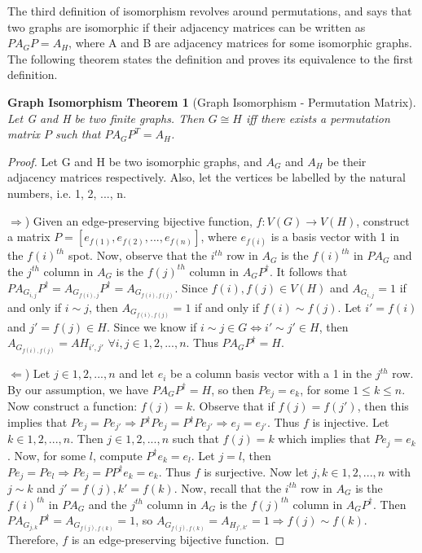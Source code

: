 \documentclass[12pt]{article}
\newtheorem{GraphIsomorphism}{Graph Isomorphism Theorem}
\theoremstyle{definition}
\begin{document}
The third definition of isomorphism revolves around permutations, and says that two graphs are isomorphic if their adjacency matrices can be written as $PA_GP = A_H$, where A and B are adjacency matrices for some isomorphic graphs. The following theorem states the definition and proves its equivalence to the first definition.

\begin{GraphIsomorphism}[Graph Isomorphism - Permutation Matrix]
Let G and H be two finite graphs. Then $G \cong H$ iff there exists a permutation matrix $P$ such that $PA_GP^T = A_H$.
\end{GraphIsomorphism}

\begin{proof}
Let G and H be two isomorphic graphs, and $A_G$ and $A_H$ be their adjacency matrices respectively. Also, let the vertices be labelled by the natural numbers, i.e. 1, 2, ..., n.

$\Rightarrow$) Given an edge-preserving bijective function, $f:V(G) \to V(H)$, construct a matrix $P = [e_{f(1)}, e_{f(2)}, ..., e_{f(n)}]$, where $e_{f(i)}$ is a basis vector with 1 in the $f(i)^{th}$ spot. Now, observe that the $i^{th}$ row in $A_G$ is the $f(i)^{th}$ in $PA_G$ and the $j^{th}$ column in $A_G$ is the $f(j)^{th}$ column in $A_GP^{\dag}$. It follows that $PA_{G_{i, j}}P^{\dag} = A_{G_{f(i), j}}P^{\dag} = A_{G_{f(i), f(j)}}$. Since $f(i), f(j) \in V(H)$ and $A_{G_{i, j}} = 1$ if and only if $i \sim j$, then $A_{G_{f(i), f(j)}} = 1$ if and only if $f(i) \sim f(j)$. Let $i' = f(i)$ and $j' = f(j) \in H$. Since we know if $i \sim j \in G \Leftrightarrow i' \sim j' \in H$, then $A_{G_{f(i), f(j)}} = A{H_{i', j'}}$ $\forall i, j \in 1, 2, ..., n$. Thus $PA_GP^{\dag} = H$.

$\Leftarrow$) Let $j \in 1, 2, ..., n$ and let $e_i$ be a column basis vector with a 1 in the $j^{th}$ row. By our assumption, we have $PA_GP^{\dag} = H$, so then $Pe_j = e_k$, for some $1 \leq k \leq n$. Now construct a function: $f(j) = k$. Observe that if $f(j) = f(j')$, then this implies that $Pe_j = Pe_{j'} \Rightarrow P^{\dag}Pe_j = P^{\dag}Pe_{j'} \Rightarrow e_j = e_{j'}$. Thus $f$ is injective. Let $k \in 1, 2, ..., n$. Then $j \in 1, 2, ..., n$ such that $f(j) = k$ which implies that $Pe_j = e_k$. Now, for some $l$, compute $P^{\dag}e_k = e_l$. Let $j = l$, then $Pe_j = Pe_l \Rightarrow Pe_j = PP^{\dag}e_k = e_k$. Thus $f$ is surjective. Now let $j, k \in 1, 2, ..., n$ with $j \sim k$ and $j' = f(j), k' = f(k)$. Now, recall that the $i^{th}$ row in $A_G$ is the $f(i)^{th}$ in $PA_G$ and the $j^{th}$ column in $A_G$ is the $f(j)^{th}$ column in $A_GP^{\dag}$. Then $PA_{G_{j, k}}P^{\dag} = A_{G_{f(j), f(k)}} = 1$, so $A_{G_{f(j), f(k)}} = A_{H_{j', k'}} = 1 \Rightarrow f(j) \sim f(k)$. Therefore, $f$ is an edge-preserving bijective function.

\end{proof}
\end{document}
